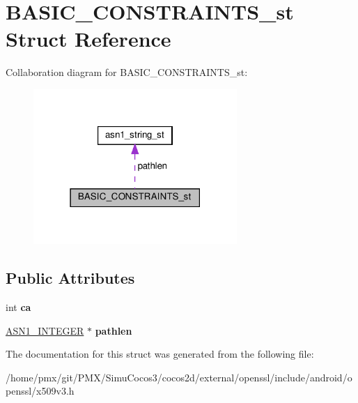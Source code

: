 \hypertarget{structBASIC__CONSTRAINTS__st}{}\section{B\+A\+S\+I\+C\+\_\+\+C\+O\+N\+S\+T\+R\+A\+I\+N\+T\+S\+\_\+st Struct Reference}
\label{structBASIC__CONSTRAINTS__st}


Collaboration diagram for B\+A\+S\+I\+C\+\_\+\+C\+O\+N\+S\+T\+R\+A\+I\+N\+T\+S\+\_\+st\+:
\nopagebreak
\begin{figure}[H]
\begin{center}
\leavevmode
\includegraphics[width=219pt]{structBASIC__CONSTRAINTS__st__coll__graph}
\end{center}
\end{figure}
\subsection*{Public Attributes}
\begin{DoxyCompactItemize}
\item 
\mbox{\label{structBASIC__CONSTRAINTS__st_ab8ac4eeb5ae30bd87b9ffdef9e35c218}} 
int {\bfseries ca}
\item 
\mbox{\label{structBASIC__CONSTRAINTS__st_a10039728b04bccc01ae9c687d08abbd4}} 
\hyperlink{structasn1__string__st}{A\+S\+N1\+\_\+\+I\+N\+T\+E\+G\+ER} $\ast$ {\bfseries pathlen}
\end{DoxyCompactItemize}


The documentation for this struct was generated from the following file\+:\begin{DoxyCompactItemize}
\item 
/home/pmx/git/\+P\+M\+X/\+Simu\+Cocos3/cocos2d/external/openssl/include/android/openssl/x509v3.\+h\end{DoxyCompactItemize}
